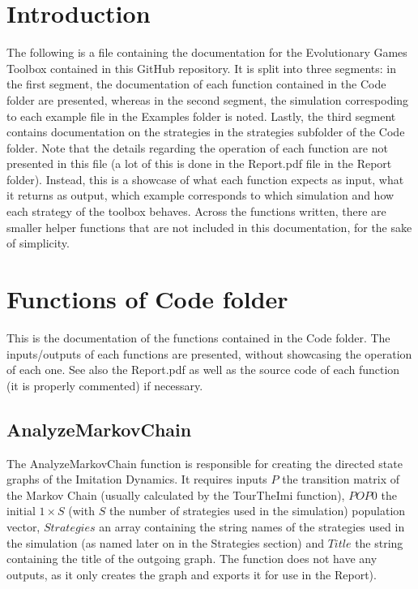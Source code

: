 \documentclass[12pt]{article}
\begin{document}
\tableofcontents %

\clearpage
\section{Introduction}
The following is a file containing the documentation for the Evolutionary Games Toolbox contained in this GitHub repository. It is split into three segments: in the first segment, the documentation of each function contained in the Code folder are presented, whereas in the second segment, the simulation correspoding to each example file in the Examples folder is noted. Lastly, the third segment contains documentation on the strategies in the strategies subfolder of the Code folder. Note that the details regarding the operation of each function are not presented in this file (a lot of this is done in the Report.pdf file in the Report folder). Instead, this is a showcase of what each function expects as input, what it returns as output, which example corresponds to which simulation and how each strategy of the toolbox behaves. Across the functions written, there are smaller helper functions that are not included in this documentation, for the sake of simplicity.

\section{Functions of Code folder}
This is the documentation of the functions contained in the Code folder. The inputs/outputs of each functions are presented, without showcasing the operation of each one. See also the Report.pdf as well as the source code of each function (it is properly commented) if necessary.

\subsection{AnalyzeMarkovChain}
The AnalyzeMarkovChain function is responsible for creating the directed state graphs of the Imitation Dynamics. It requires inputs $P$ the transition matrix of the Markov Chain (usually calculated by the TourTheImi function), $POP0$ the initial $1 \times S$ (with $S$ the number of strategies used in the simulation) population vector, $Strategies$ an array containing the string names of the strategies used in the simulation (as named later on in the Strategies section) and $Title$ the string containing the title of the outgoing graph. The function does not have any outputs, as it only creates the graph and exports it for use in the Report).
\end{document}
